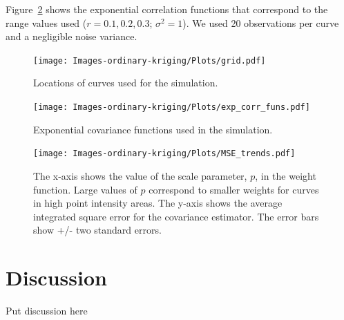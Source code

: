 Figure~\ref{fig:exp_corr_funs} shows the exponential correlation functions that correspond to the range values used ($r = 0.1, 0.2, 0.3$; $\sigma^2=1$). We used 20 observations per curve and a negligible noise variance. 

\begin{figure}
	\begin{center}
		\texttt{[image: Images-ordinary-kriging/Plots/grid.pdf]} 
	\end{center}
	\caption{Locations of curves used for the simulation.} \label{fig:grid3} 
\end{figure}

\begin{figure}
	\begin{center}
		\texttt{[image: Images-ordinary-kriging/Plots/exp\_corr\_funs.pdf]} 
	\end{center}
	\caption{Exponential covariance functions used in the simulation.} \label{fig:exp_corr_funs} 
\end{figure}

\begin{figure}
	\begin{center}
		\texttt{[image: Images-ordinary-kriging/Plots/MSE\_trends.pdf]} 
	\end{center}
	\caption{The x-axis shows the value of the scale parameter, $p$, in the weight function. Large values of $p$ correspond to smaller weights for curves in high point intensity areas. The y-axis shows the average integrated square error for the covariance estimator. The error bars show +/- two standard errors.} \label{fig:MSE_trends} 
\end{figure}

\section{Discussion} %
\label{sec:discussion}
Put discussion here

